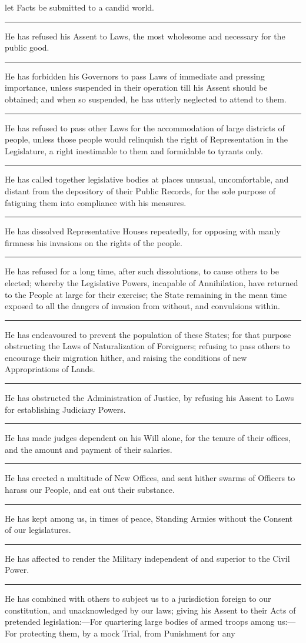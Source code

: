 \documentclass{article}
\begin{document}
let Facts be submitted to a candid world.\rule[.5ex]{3em}{.2pt}He has
refused his Assent to Laws, the most wholesome and necessary for the
public good.\rule[.5ex]{2em}{.2pt}He has forbidden his Governors to
pass Laws of immediate and pressing importance, unless suspended in
their operation till his Assent should be obtained; and when so
suspended, he has utterly neglected to attend to
them.\rule[.5ex]{2em}{.2pt}He has refused to pass other Laws for the
accommodation of large districts of people, unless those people would
relinquish the right of Representation in the Legislature, a right
inestimable to them and formidable to tyrants
only.\rule[.5ex]{2em}{.2pt}He has called together legislative bodies
at places unusual, uncomfortable, and distant from the depository of
their Public Records, for the sole purpose of fatiguing them into
compliance with his measures.\rule[.5ex]{2em}{.2pt}He has dissolved
Representative Houses repeatedly, for opposing with manly firmness his
invasions on the rights of the people.\rule[.5ex]{2em}{.2pt}He has
refused for a long time, after such dissolutions, to cause others to
be elected; whereby the Legislative Powers, incapable of Annihilation,
have returned to the People at large for their exercise; the State
remaining in the mean time exposed to all the dangers of invasion from
without, and convulsions within.\rule[.5ex]{2em}{.2pt}He has
endeavoured to prevent the population of these States; for that
purpose obstructing the Laws of Naturalization of Foreigners; refusing
to pass others to encourage their migration hither, and raising the
conditions of new Appropriations of Lands.\rule[.5ex]{2em}{.2pt}He has
obstructed the Administration of Justice, by refusing his Assent to
Laws for establishing Judiciary Powers.\rule[.5ex]{2em}{.2pt}He has
made judges dependent on his Will alone, for the tenure of their
offices, and the amount and payment of their
salaries.\rule[.5ex]{2em}{.2pt}He has erected a multitude of New
Offices, and sent hither swarms of Officers to harass our People, and
eat out their substance.\rule[.5ex]{2em}{.2pt}He has kept among us, in
times of peace, Standing Armies without the Consent of our
legislatures.\rule[.5ex]{2em}{.2pt}He has affected to render the
Military independent of and superior to the Civil
Power.\rule[.5ex]{2em}{.2pt}He has combined with others to subject us
to a jurisdiction foreign to our constitution, and unacknowledged by
our laws; giving his Assent to their Acts of pretended
legislation:---For quartering large bodies of armed troops among
us:---For protecting them, by a mock Trial, from Punishment for any
\end{document}
